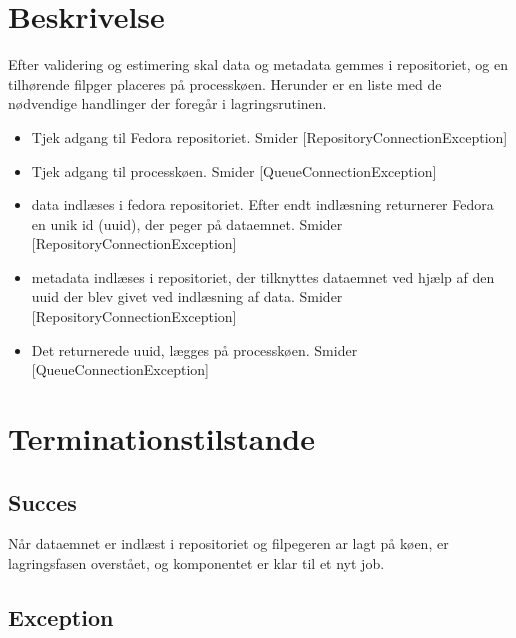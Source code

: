 \documentclass{article}
\begin{document}
\section{Beskrivelse}
Efter validering og estimering skal data og metadata gemmes i repositoriet, og en tilhørende filpger placeres på processkøen.
Herunder er en liste med de nødvendige handlinger der foregår i lagringsrutinen.

\begin{itemize} 

\item Tjek adgang til Fedora repositoriet. Smider [RepositoryConnectionException] 
\item Tjek adgang til processkøen. Smider [QueueConnectionException] 

\item data indlæses i fedora repositoriet. Efter endt indlæsning returnerer Fedora en unik id (uuid), der peger på dataemnet. Smider [RepositoryConnectionException]

\item  metadata indlæses i repositoriet, der tilknyttes dataemnet ved
hjælp af den uuid der blev givet ved indlæsning af data. Smider
[RepositoryConnectionException]
\item 
Det returnerede uuid, lægges på processkøen.
Smider [QueueConnectionException] 

\end{itemize}

\section{Terminationstilstande}

\subsection{Succes}
Når dataemnet er indlæst i repositoriet og filpegeren ar lagt på køen,
er lagringsfasen overstået, og komponentet er klar til et nyt job.

\subsection{Exception}
\end{document}
